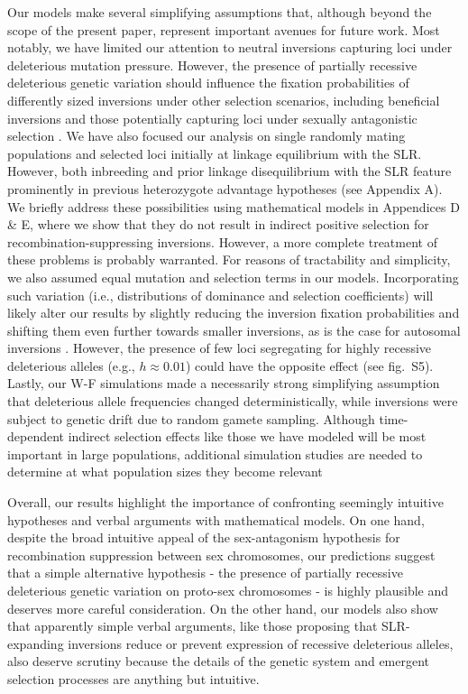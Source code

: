 \documentclass[11pt]{article}
\begin{document}
Our models make several simplifying assumptions that, although beyond the scope of the present paper, represent important avenues for future work. Most notably, we have limited our attention to neutral inversions capturing loci under deleterious mutation pressure. However, the presence of partially recessive deleterious genetic variation should influence the fixation probabilities of differently sized inversions under other selection scenarios, including beneficial inversions and those potentially capturing loci under sexually antagonistic selection \citep[e.g.,][]{OlitoAbbott2020}. We have also focused our analysis on single randomly mating populations and selected loci initially at linkage equilibrium with the SLR. However, both inbreeding and prior linkage disequilibrium with the SLR feature prominently in previous heterozygote advantage hypotheses (see Appendix A). We briefly address these possibilities using mathematical models in Appendices D \& E, where we show that they do not result in indirect positive selection for recombination-suppressing inversions. However, a more complete treatment of these problems is probably warranted. For reasons of tractability and simplicity, we also assumed equal mutation and selection terms in our models. Incorporating such variation (i.e., distributions of dominance and selection coefficients) will likely alter our results by slightly reducing the inversion fixation probabilities and shifting them even further towards smaller inversions, as is the case for autosomal inversions \citep{ConnallonOlito2020}. However, the presence of few loci segregating for highly recessive deleterious alleles (e.g., $h \approx 0.01$) could have the opposite effect (see fig.~S5). Lastly, our W-F simulations made a necessarily strong simplifying assumption that deleterious allele frequencies changed deterministically, while inversions were subject to genetic drift due to random gamete sampling. Although time-dependent indirect selection effects like those we have modeled will be most important in large populations, additional simulation studies are needed to determine at what population sizes they become relevant 

Overall, our results highlight the importance of confronting seemingly intuitive hypotheses and verbal arguments with mathematical models. On one hand, despite the broad intuitive appeal of the sex-antagonism hypothesis for recombination suppression between sex chromosomes, our predictions suggest that a simple alternative hypothesis - the presence of partially recessive deleterious genetic variation on proto-sex chromosomes - is highly plausible and deserves more careful consideration. On the other hand, our models also show that apparently simple verbal arguments, like those proposing that SLR-expanding inversions reduce or prevent expression of recessive deleterious alleles, also deserve scrutiny because the details of the genetic system and emergent selection processes are anything but intuitive. 
\end{document}
